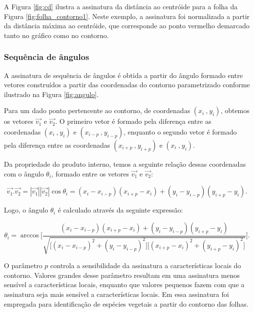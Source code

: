 A Figura \ref{fig:cd} ilustra a assinatura da distância ao centróide para a folha da Figura \ref{fig:folha_contorno1}. Neste exemplo, a assinatura foi normalizada a partir da distância máxima ao centróide, que corresponde ao ponto vermelho demarcado tanto no gráfico como no contorno. 

\subsubsection*{Sequência de ângulos}

A assinatura de sequência de ângulos é obtida a partir do ângulo formado entre vetores construídos a partir das coordenadas do contorno parametrizado conforme ilustrado na Figura \ref{fig:angulo}. 

Para um dado ponto pertencente ao contorno, de coordenadas $(x_i\:\text{,}\:y_i)$, obtemos os vetores $\overrightarrow{v_1}$ e $\overrightarrow{v_2}$. O primeiro vetor é formado pela diferença entre as coordenadas $(x_i\:\text{,}\:y_i)$ e $(x_{i-p}\:\text{,}\:y_{i-p})$, enquanto o segundo vetor é formado pela diferença entre as coordenadas $(x_{i+p}\:\text{,}\:y_{i+p})$ e $(x_i\:\text{,}\:y_i)$. 

Da propriedade do produto interno, temos a seguinte relação dessas coordenadas com o ângulo $\theta_i$, formado entre os vetores $\overrightarrow{v_1}$ e $\overrightarrow{v_2}$:

\begin{equation}
\overrightarrow{v_1}. \overrightarrow{v_2} = |\overrightarrow{v_1}||\overrightarrow{v_2}|\cos{\theta_i}=(x_i-x_{i-p})(x_{i+p}-x_i)+(y_i-y_{i-p})(y_{i+p}-y_i)\text{.}
\end{equation}

Logo, o ângulo $\theta_i$ é calculado através da seguinte expressão:

\begin{equation}
\theta_i = \arccos{\Big[\frac{(x_i-x_{i-p})(x_{i+p}-x_i)+(y_i-y_{i-p})(y_{i+p}-y_i)}{\sqrt{\big[(x_i-x_{i-p})^2+(y_i-y_{i-p})^2\big]\big[(x_{i+p}-x_i)^2+(y_{i+p}-y_i)^2\big]}}\Big]}\text{.}
\end{equation}

O parâmetro $p$ controla a sensibilidade da assinatura a características locais do contorno. Valores grandes desse parâmetro resultam em uma assinatura menos sensível a características locais, enquanto que valores pequenos fazem com que a assinatura seja mais sensível a características locais.  Em \cite{Fotopoulou:2013} essa assinatura foi empregada para identificação de espécies vegetais a partir do contorno das folhas.

